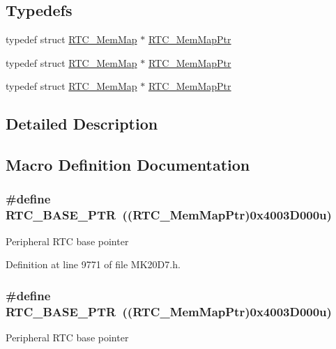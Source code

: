 \subsection*{Typedefs}
\begin{DoxyCompactItemize}
\item 
typedef struct \hyperlink{struct_r_t_c___mem_map}{R\+T\+C\+\_\+\+Mem\+Map} $\ast$ \hyperlink{group___r_t_c___peripheral_gac92da66fe1171e5751505df29917b152}{R\+T\+C\+\_\+\+Mem\+Map\+Ptr}
\item 
typedef struct \hyperlink{struct_r_t_c___mem_map}{R\+T\+C\+\_\+\+Mem\+Map} $\ast$ \hyperlink{group___r_t_c___peripheral_gac92da66fe1171e5751505df29917b152}{R\+T\+C\+\_\+\+Mem\+Map\+Ptr}
\item 
typedef struct \hyperlink{struct_r_t_c___mem_map}{R\+T\+C\+\_\+\+Mem\+Map} $\ast$ \hyperlink{group___r_t_c___peripheral_gac92da66fe1171e5751505df29917b152}{R\+T\+C\+\_\+\+Mem\+Map\+Ptr}
\end{DoxyCompactItemize}


\subsection{Detailed Description}


\subsection{Macro Definition Documentation}
\subsubsection[{\texorpdfstring{R\+T\+C\+\_\+\+B\+A\+S\+E\+\_\+\+P\+TR}{RTC_BASE_PTR}}]{\setlength{\rightskip}{0pt plus 5cm}\#define R\+T\+C\+\_\+\+B\+A\+S\+E\+\_\+\+P\+TR~(({\bf R\+T\+C\+\_\+\+Mem\+Map\+Ptr})0x4003\+D000u)}\hypertarget{group___r_t_c___peripheral_ga6455e2b767b4b224b4f00b50e87a2441}{}\label{group___r_t_c___peripheral_ga6455e2b767b4b224b4f00b50e87a2441}
Peripheral R\+TC base pointer 

Definition at line 9771 of file M\+K20\+D7.\+h.

\subsubsection[{\texorpdfstring{R\+T\+C\+\_\+\+B\+A\+S\+E\+\_\+\+P\+TR}{RTC_BASE_PTR}}]{\setlength{\rightskip}{0pt plus 5cm}\#define R\+T\+C\+\_\+\+B\+A\+S\+E\+\_\+\+P\+TR~(({\bf R\+T\+C\+\_\+\+Mem\+Map\+Ptr})0x4003\+D000u)}\hypertarget{group___r_t_c___peripheral_ga6455e2b767b4b224b4f00b50e87a2441}{}\label{group___r_t_c___peripheral_ga6455e2b767b4b224b4f00b50e87a2441}
Peripheral R\+TC base pointer 

